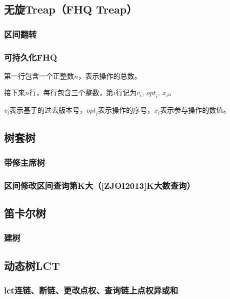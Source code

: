 \documentclass[landscape,twocolumn,twoside,a4paper]{article}
\begin{document}
\subsection{无旋Treap（FHQ Treap）}
\subsubsection{区间翻转}


\subsubsection{可持久化FHQ}
第一行包含一个正整数$n$，表示操作的总数。\par
接下来$n$行，每行包含三个整数，第$i$行记为${v}_{i}$, ${opt}_i$, $x_i$。\par
$v_i$表示基于的过去版本号，${opt}_i$表示操作的序号，$x_i$表示参与操作的数值。



\subsection{树套树}

\subsubsection{带修主席树}


\subsubsection{区间修改区间查询第K大（[ZJOI2013]K大数查询）}


\subsection{笛卡尔树}
\subsubsection{建树}



\subsection{动态树LCT}

\subsubsection{lct连链、断链、更改点权、查询链上点权异或和}

\end{document}
